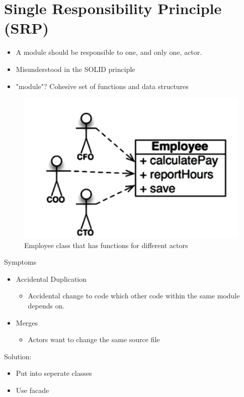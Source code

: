 \documentclass[../Main.tex]{subfiles}
\begin{document}
\section{Single Responsibility Principle (SRP)}
\begin{itemize}
    \item A module should be responsible to	one, and only one, actor.
    \item Misunderstood in the SOLID principle
    \item "module"?	Cohesive set of functions and data structures
\end{itemize}

\begin{figure}[H]
    \centering
    \includegraphics[width=0.75\linewidth]{Images/cleanarch/employee.png}
    \caption{Employee class that has functions for different actors}
\end{figure}

Symptoms
 \begin{itemize}
    \item Accidental Duplication
        \begin{itemize}
            \item Accidental change to code which other code within the same module depends on.
        \end{itemize}
    \item Merges
        \begin{itemize}
            \item Actors want to change the same source file
        \end{itemize}
 \end{itemize}

 Solution:
 \begin{itemize}
    \item Put into seperate classes
    \item Use facade
 \end{itemize}
\end{document}
